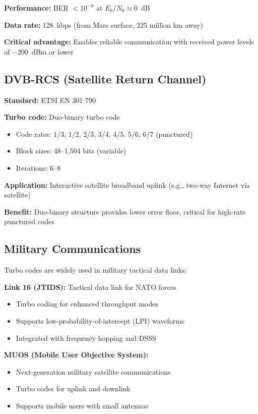 \textbf{Performance:} BER $< 10^{-8}$ at $E_b/N_0 \approx 0$~dB

\textbf{Data rate:} 128~kbps (from Mars surface, 225 million km away)

\textbf{Critical advantage:} Enables reliable communication with received power levels of $-200$~dBm or lower

\subsection{DVB-RCS (Satellite Return Channel)}

\textbf{Standard:} ETSI EN 301 790

\textbf{Turbo code:} Duo-binary turbo code
\begin{itemize}
\item Code rates: 1/3, 1/2, 2/3, 3/4, 4/5, 5/6, 6/7 (punctured)
\item Block sizes: 48--1,504 bits (variable)
\item Iterations: 6--8
\end{itemize}

\textbf{Application:} Interactive satellite broadband uplink (e.g., two-way Internet via satellite)

\textbf{Benefit:} Duo-binary structure provides lower error floor, critical for high-rate punctured codes

\subsection{Military Communications}

Turbo codes are widely used in military tactical data links:

\textbf{Link 16 (JTIDS):} Tactical data link for NATO forces
\begin{itemize}
\item Turbo coding for enhanced throughput modes
\item Supports low-probability-of-intercept (LPI) waveforms
\item Integrated with frequency hopping and DSSS
\end{itemize}

\textbf{MUOS (Mobile User Objective System):}
\begin{itemize}
\item Next-generation military satellite communications
\item Turbo codes for uplink and downlink
\item Supports mobile users with small antennas
\end{itemize}


